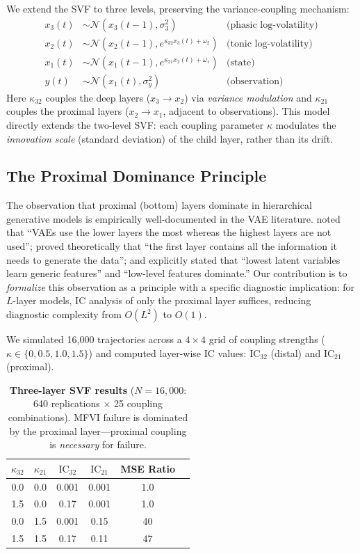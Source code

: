 \documentclass[10pt]{article} %
\theoremstyle{plain}
\theoremstyle{definition}
\newcommand{\IC}{\mathrm{IC}}  %
\begin{document}
We extend the SVF to three levels, preserving the variance-coupling mechanism:
\begin{align}
x_3(t) &\sim \mathcal{N}(x_3(t-1), \sigma_3^2) & \text{(phasic log-volatility)} \\
x_2(t) &\sim \mathcal{N}(x_2(t-1), e^{\kappa_{32} x_3(t) + \omega_2}) & \text{(tonic log-volatility)} \\
x_1(t) &\sim \mathcal{N}(x_1(t-1), e^{\kappa_{21} x_2(t) + \omega_1}) & \text{(state)} \\
y(t) &\sim \mathcal{N}(x_1(t), \sigma_y^2) & \text{(observation)}
\end{align}
Here $\kappa_{32}$ couples the deep layers ($x_3 \to x_2$) via \emph{variance modulation} and $\kappa_{21}$ couples the proximal layers ($x_2 \to x_1$, adjacent to observations). This model directly extends the two-level SVF: each coupling parameter $\kappa$ modulates the \emph{innovation scale} (standard deviation) of the child layer, rather than its drift.

\subsection{The Proximal Dominance Principle}

The observation that proximal (bottom) layers dominate in hierarchical generative models is empirically well-documented in the VAE literature. \citet{sonderby2016ladder} noted that ``VAEs use the lower layers the most whereas the highest layers are not used''; \citet{zhao2017infovae} proved theoretically that ``the first layer contains all the information it needs to generate the data''; and \citet{havtorn2021hierarchical} explicitly stated that ``lowest latent variables learn generic features'' and ``low-level features dominate.'' Our contribution is to \emph{formalize} this observation as a principle with a specific diagnostic implication: for $L$-layer models, IC analysis of only the proximal layer suffices, reducing diagnostic complexity from $O(L^2)$ to $O(1)$.

We simulated 16,000 trajectories across a $4 \times 4$ grid of coupling strengths ($\kappa \in \{0, 0.5, 1.0, 1.5\}$) and computed layer-wise IC values: $\IC_{32}$ (distal) and $\IC_{21}$ (proximal).

\begin{table}[!htbp]
\centering
\caption{\textbf{Three-layer SVF results} ($N = 16{,}000$: 640 replications $\times$ 25 coupling combinations). MFVI failure is dominated by the proximal layer---proximal coupling is \emph{necessary} for failure.}
\label{tab:3layer}
\begin{tabular}{@{}cccccc@{}}
\toprule
$\kappa_{32}$ & $\kappa_{21}$ & $\IC_{32}$ & $\IC_{21}$ & MSE Ratio \\
\midrule
0.0 & 0.0 & 0.001 & 0.001 & 1.0 \\
1.5 & 0.0 & 0.17 & 0.001 & 1.0 \\
0.0 & 1.5 & 0.001 & 0.15 & 40 \\
1.5 & 1.5 & 0.17 & 0.11 & 47 \\
\bottomrule
\end{tabular}
\end{table}
\end{document}
